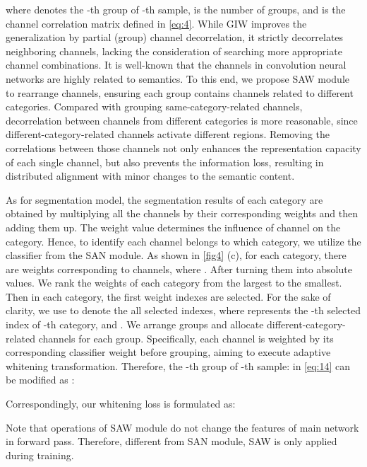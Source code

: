 \documentclass[10pt,twocolumn,letterpaper]{article}
\begin{document}
where  denotes the -th group of -th sample,  is the number of groups, and  is the channel correlation matrix defined in \cref{eq:4}. While GIW improves the generalization by partial (group) channel decorrelation, it strictly decorrelates neighboring channels, lacking the consideration of searching more appropriate channel combinations. It is well-known that the channels in convolution neural networks are highly related to semantics. To this end, we propose SAW module to rearrange channels, ensuring each group contains channels related to different categories. Compared with grouping same-category-related channels, decorrelation between channels from different categories is more reasonable, since different-category-related channels activate different regions. Removing the correlations between those channels not only enhances the representation capacity of each single channel, but also prevents the information loss, resulting in distributed alignment with minor changes to the semantic content.

As for segmentation model,  the segmentation results of each category are obtained by multiplying all the channels by their corresponding weights and then adding them up. The weight value determines the influence of channel on the category. Hence, to identify each channel belongs to which category, we utilize the classifier from the SAN module. As shown in \cref{fig4} (c), for each category, there are  weights corresponding to  channels, \ie  where . After turning them into absolute values. We rank the weights of each category from the largest to the smallest. Then in each category, the first  weight indexes are selected. For the sake of clarity, we use  to denote the all selected indexes, where  represents the -th selected index of -th category,  and . We arrange  groups and allocate  different-category-related channels for each group. Specifically, each channel is weighted by its corresponding classifier weight before grouping, aiming to execute adaptive whitening transformation. Therefore, the -th group of -th sample:  in \cref{eq:14} can be modified as :
\vspace{-0.8mm}


\noindent Correspondingly, our whitening loss is formulated as:
\vspace{-1.2mm}




Note that operations of SAW module do not change the features of main network in forward pass. Therefore, different from SAN module, SAW is only applied during training.
\end{document}
